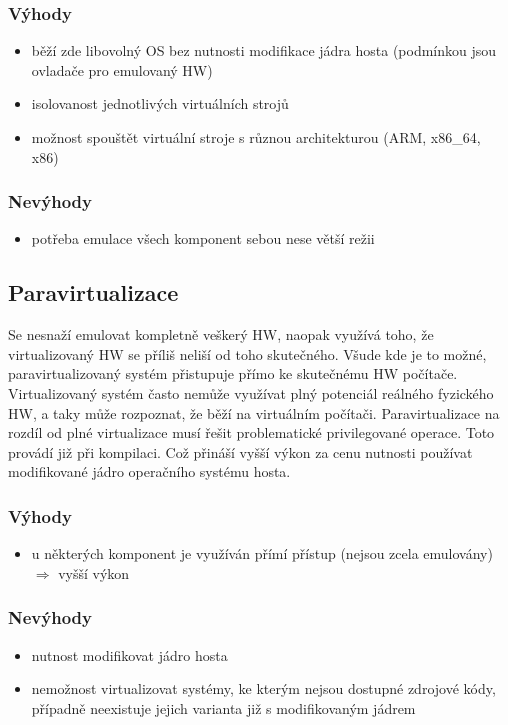 \subsubsection*{Výhody}
\begin{itemize}
  \item běží zde libovolný OS bez nutnosti modifikace jádra hosta (podmínkou jsou ovladače pro emulovaný HW)
  \item isolovanost jednotlivých virtuálních strojů
  \item možnost spouštět virtuální stroje s různou architekturou (ARM, x86\_64, x86)
\end{itemize}
\subsubsection*{Nevýhody}
\begin{itemize}
  \item potřeba emulace všech komponent sebou nese větší režii
\end{itemize}
\subsection{Paravirtualizace}
Se nesnaží emulovat kompletně veškerý HW, naopak využívá toho, že virtualizovaný HW se příliš neliší od toho skutečného. Všude kde je to možné, paravirtualizovaný systém přistupuje přímo ke skutečnému HW počítače. Virtualizovaný systém často nemůže využívat plný potenciál reálného fyzického HW, a taky může rozpoznat, že běží na virtuálním počítači. Paravirtualizace na rozdíl od plné virtualizace musí řešit problematické privilegované operace. Toto provádí již při kompilaci. Což přináší vyšší výkon za cenu nutnosti používat modifikované jádro operačního systému hosta.
\subsubsection*{Výhody}
\begin{itemize}
  \item u některých komponent je využíván přímí přístup (nejsou zcela emulovány) $\Rightarrow$ vyšší výkon
\end{itemize}
\subsubsection*{Nevýhody}
\begin{itemize}
  \item nutnost modifikovat jádro hosta
  \item nemožnost virtualizovat systémy, ke kterým nejsou dostupné zdrojové kódy, případně neexistuje jejich varianta již s modifikovaným jádrem
\end{itemize}

